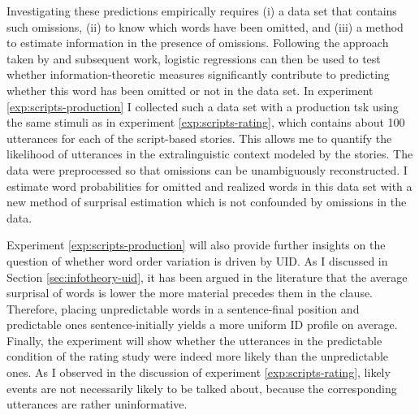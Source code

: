 Investigating these predictions empirically requires (i) a data set that contains such omissions, (ii) to know  which words have been omitted, and (iii) a method to estimate information in the presence of omissions. Following the approach taken by \citet{levy.jaeger2007} and subsequent work, logistic regressions can then be used to test whether information-theoretic measures significantly contribute to predicting whether this word has been omitted or not in the data set. In experiment \ref{exp:scripts-production} I collected such a data set with a production tsk using the same stimuli as in experiment \ref{exp:scripts-rating}, which contains about 100 utterances for each of the script-based stories. This allows me to quantify the likelihood of utterances in the extralinguistic context modeled by the stories. The data were preprocessed so that omissions can be unambiguously reconstructed. I estimate word probabilities for omitted and realized words in this data set with  a new method of surprisal estimation which is not confounded by omissions in the data.

Experiment \ref{exp:scripts-production} will also provide further insights on the question of whether word order variation is driven by UID. As I discussed in Section \ref{sec:infotheory-uid}, it has been argued in the literature that the average surprisal of words is lower the more material precedes them in the clause. Therefore, placing unpredictable words in a sentence-final position and predictable ones sentence-initially yields a more uniform ID profile on average. Finally, the experiment will show whether the utterances in the predictable condition of the rating study were indeed more likely than the unpredictable ones. As I observed in the discussion of experiment \ref{exp:scripts-rating}, likely events are not necessarily likely to be talked about, because the corresponding utterances are rather uninformative.

